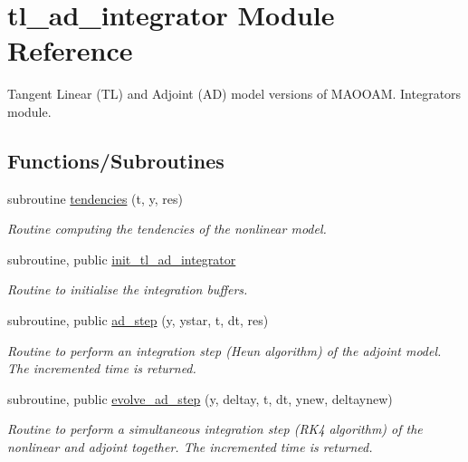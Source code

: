 \hypertarget{namespacetl__ad__integrator}{}\section{tl\+\_\+ad\+\_\+integrator Module Reference}
\label{namespacetl__ad__integrator}


Tangent Linear (TL) and Adjoint (AD) model versions of M\+A\+O\+O\+AM. Integrators module.  


\subsection*{Functions/\+Subroutines}
\begin{DoxyCompactItemize}
\item 
subroutine \hyperlink{namespacetl__ad__integrator_aa03be9677761cfa373b15c85cccdc424}{tendencies} (t, y, res)
\begin{DoxyCompactList}\small\item\em Routine computing the tendencies of the nonlinear model. \end{DoxyCompactList}\item 
subroutine, public \hyperlink{namespacetl__ad__integrator_aeef5ff45fe5f9b73ceb8d72c195dc381}{init\+\_\+tl\+\_\+ad\+\_\+integrator}
\begin{DoxyCompactList}\small\item\em Routine to initialise the integration buffers. \end{DoxyCompactList}\item 
subroutine, public \hyperlink{namespacetl__ad__integrator_a708ece5eac01486e65e889d19073fd19}{ad\+\_\+step} (y, ystar, t, dt, res)
\begin{DoxyCompactList}\small\item\em Routine to perform an integration step (Heun algorithm) of the adjoint model. The incremented time is returned. \end{DoxyCompactList}\item 
subroutine, public \hyperlink{namespacetl__ad__integrator_abc53f72486953af9fa4ced620eee226f}{evolve\+\_\+ad\+\_\+step} (y, deltay, t, dt, ynew, deltaynew)
\begin{DoxyCompactList}\small\item\em Routine to perform a simultaneous integration step (R\+K4 algorithm) of the nonlinear and adjoint together. The incremented time is returned. \end{DoxyCompactList}\item 

\end{DoxyCompactItemize}
